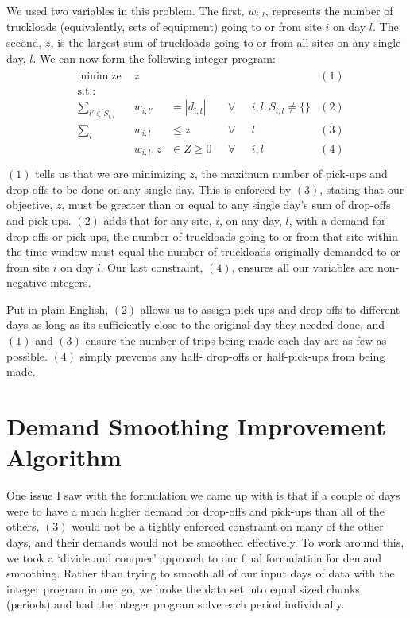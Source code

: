 \documentclass[letterpaper,10pt,english]{sphinxmanual}
\begin{document}
We used two variables in this problem. The first,
\(w_{i,l}\), represents the number of truckloads (equivalently, sets of
equipment) going to or from site \(i\) on day \(l\). The second,
\(z\), is the largest sum of truckloads going to or from all sites on any
single day, \(l\). We can now form the following integer program:
\begin{align*}\!\begin{aligned}
&\text{minimize } &z & & & &(1)\\
&\text{s.t.:} & & & &\\
& \sum_{l' \in S_{i,l}} & w_{i,l'} & = |d_{i,l}| \text{ } & \forall
& \text{ } i,l : S_{i,l} \neq \{\} &(2)\\
& \sum_{i} & w_{i,l} & \leq z \text{ } & \forall & \text{ } l &(3)\\
& & w_{i,l}, z & \in Z \geq 0 \text{ } & \forall & \text{ } i,l & (4)\\
\end{aligned}\end{align*}
\((1)\) tells us that we are minimizing \(z\), the maximum number of
pick-ups and drop-offs to be done on any single day. This is enforced by
\((3)\), stating that our objective, \(z\), must be greater than or
equal to any single day's sum of drop-offs and pick-ups.
\((2)\) adds that for any site, \(i\), on any day, \(l\), with a
demand for drop-offs or pick-ups, the number of truckloads going to or from
that site within the time window must equal the number of truckloads
originally demanded to or from site \(i\) on day \(l\). Our last
constraint, \((4)\), ensures all our variables are non-negative integers.

Put in plain English, \((2)\) allows us to assign pick-ups and drop-offs
to different days as long as its sufficiently close to the original day they
needed done, and \((1)\) and \((3)\) ensure the number of trips being
made each day are as few as possible. \((4)\) simply prevents any half-
drop-offs or half-pick-ups from being made.


\section{Demand Smoothing Improvement Algorithm}
\label{\detokenize{variation:demand-smoothing-improvement-algorithm}}
One issue I saw with the formulation we came up with is that if a couple of
days were to have a much higher demand for drop-offs and pick-ups than
all of the others, \((3)\) would not be a tightly enforced
constraint on many of the other days, and their demands would not be smoothed
effectively. To work around this, we took a `divide and conquer' approach to
our final formulation for demand smoothing. Rather than trying to smooth all of our
input days of data with the integer program in one go, we broke the data set
into equal sized chunks (periods) and had the integer program solve each
period individually.
\end{document}
